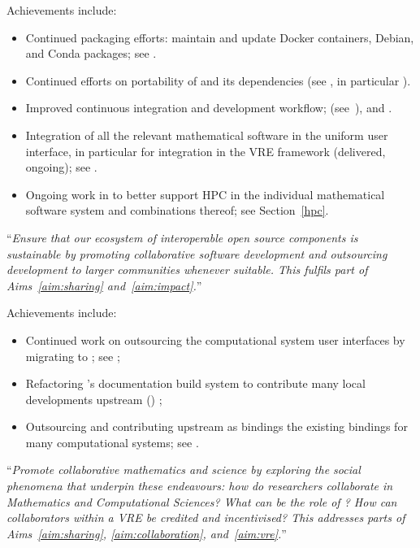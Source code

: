 \begin{compactenum}[\bf O1\rm:]
Achievements include:
\begin{itemize}
\item Continued packaging efforts: maintain and update Docker
  containers, Debian, and Conda packages; see
  .
\item Continued efforts on portability of \Sage and its dependencies
  (see , in
  particular ).
\item Improved continuous integration and development workflow;
  (see~), and
  .
\item Integration of all the relevant mathematical software in the
  uniform \Jupyter user interface, in particular for integration in
  the VRE framework (delivered, ongoing); see
  .
\item Ongoing work in  to better support HPC in the
  individual mathematical software system and combinations thereof;
  see Section~\ref{hpc}.
\end{itemize}

\item \label{objective:sustainable} ``\emph{Ensure that our ecosystem of
  interoperable open source components is \emph{sustainable} by
  promoting collaborative software development and outsourcing
  development to larger communities whenever suitable. This fulfils
  part of Aims~\ref{aim:sharing} and~\ref{aim:impact}.}''

Achievements include:
\begin{itemize}
\item Continued work on outsourcing the computational system user
  interfaces by migrating to \Jupyter; see ;
\item Refactoring \Sage's documentation build system to contribute many local developments
  upstream (\Sphinx) ;
\item Outsourcing and contributing upstream as \Python bindings the existing \Sage
  bindings for many computational systems; see .
\end{itemize}

\item \label{objective:social} ``\emph{Promote collaborative mathematics and
  science by exploring the social phenomena that underpin these
  endeavours: how do researchers collaborate in Mathematics and
  Computational Sciences?  What can be the role of \VREs?  How can
  collaborators within a VRE be credited and incentivised? This
  addresses parts of Aims~\ref{aim:sharing}, \ref{aim:collaboration},
  and~\ref{aim:vre}.}''


\end{compactenum}
